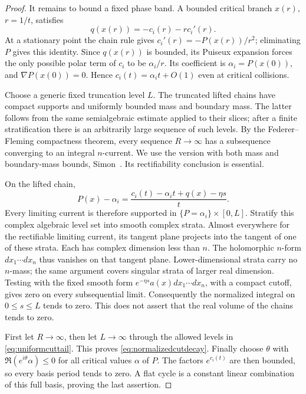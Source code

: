 \documentclass[11pt]{article}
\theoremstyle{definition}\newtheorem{definition}[theorem]{Definition}
\theoremstyle{remark}\newtheorem{remark}[theorem]{Remark}
\begin{document}
\begin{proof}
It remains to bound a fixed phase band. A bounded critical branch
$x(r)$, $r=1/t$, satisfies
\[
 q(x(r))=-c_i(r)-r c_i'(r).
\]
At a stationary point the chain rule gives $c_i'(r)=-P(x(r))/r^2$;
eliminating $P$ gives this identity. Since $q(x(r))$ is
bounded, its Puiseux expansion forces the only possible polar
term of $c_i$ to be $\alpha_i/r$. Its coefficient is
$\alpha_i=P(x(0))$, and $\nabla P(x(0))=0$. Hence
$c_i(t)=\alpha_i t+O(1)$ even at critical collisions.

Choose a generic fixed truncation level $L$. The truncated lifted
chains have compact supports and uniformly bounded mass and
boundary mass. The latter follows from the same semialgebraic
estimate applied to their slices; after a finite stratification
there is an arbitrarily large sequence of such levels. By the
Federer--Fleming compactness theorem, every sequence $R\to\infty$
has a subsequence converging to an integral $n$-current. We use
the version with both mass and boundary-mass bounds,
Simon~\cite[Chapter~6, Section~3, Theorem~3.15]{SimonGMT}.
Its rectifiability conclusion is essential.

On the lifted chain,
\[
 P(x)-\alpha_i=
       \frac{c_i(t)-\alpha_i t+q(x)-\eta s}{t}.
\]
Every limiting current is therefore supported in
$\{P=\alpha_i\}\times[0,L]$. Stratify this complex algebraic
level set into smooth complex strata. Almost everywhere for the
rectifiable limiting current, its tangent plane projects into
the tangent of one of these strata. Each has complex dimension
less than $n$. The holomorphic $n$-form $dx_1\cdots dx_n$ thus
vanishes on that tangent plane. Lower-dimensional strata carry
no $n$-mass; the same argument covers singular strata of larger
real dimension. Testing with the fixed smooth form
$e^{-\eta s}a(x)dx_1\cdots dx_n$, with a compact cutoff, gives
zero on every subsequential limit. Consequently the normalized
integral on $0\le s\le L$ tends to zero. This does not assert
that the real volume of the chains tends to zero.

First let $R\to\infty$, then let $L\to\infty$ through the
allowed levels in \eqref{eq:uniformcuttail}. This proves
\eqref{eq:normalizedcutdecay}. Finally choose $\theta$ with
$\Re(e^{i\theta}\alpha)\le0$ for all critical values $\alpha$
of $P$. The factors $e^{c_i(t)}$ are then bounded, so every basis
period tends to zero. A flat cycle is a constant linear
combination of this full basis, proving the last assertion.
\end{proof}
\end{document}
